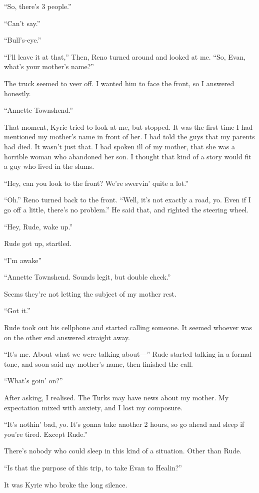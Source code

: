 \documentclass[oneside]{book}
\begin{document}
“So, there’s 3 people.”

“Can’t say.”

“Bull’s-eye.”

“I’ll leave it at that,” Then, Reno turned around and looked at me. “So, Evan, what’s your mother’s name?”

The truck seemed to veer off. I wanted him to face the front, so I answered honestly.

“Annette Townshend.”

That moment, Kyrie tried to look at me, but stopped. It was the first time I had mentioned my mother’s name in front of her. I had told the guys that my parents had died. It wasn’t just that. I had spoken ill of my mother, that she was a horrible woman who abandoned her son. I thought that kind of a story would fit a guy who lived in the slums.

“Hey, can you look to the front? We’re swervin’ quite a lot.”

“Oh.” Reno turned back to the front. “Well, it’s not exactly a road, yo. Even if I go off a little, there’s no problem.” He said that, and righted the steering wheel.

“Hey, Rude, wake up.”

Rude got up, startled.

“I’m awake”

“Annette Townshend. Sounds legit, but double check.”

Seems they’re not letting the subject of my mother rest.

“Got it.”

Rude took out his cellphone and started calling someone. It seemed whoever was on the other end answered straight away.

“It’s me. About what we were talking about—” Rude started talking in a formal tone, and soon said my mother’s name, then finished the call.

“What’s goin’ on?”

After asking, I realised. The Turks may have news about my mother. My expectation mixed with anxiety, and I lost my composure.

“It’s nothin’ bad, yo. It’s gonna take another 2 hours, so go ahead and sleep if you’re tired. Except Rude.”

There’s nobody who could sleep in this kind of a situation. Other than Rude.

“Is that the purpose of this trip, to take Evan to Healin?”

It was Kyrie who broke the long silence.
\end{document}
